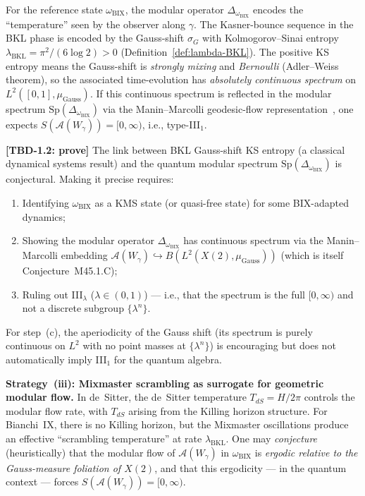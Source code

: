 For the reference state $\omega_{\mathrm{BIX}}$,
the modular operator $\Delta_{\omega_{\mathrm{BIX}}}$ encodes the
``temperature'' seen by the observer along $\gamma$.
The Kasner-bounce sequence in the BKL phase is encoded by the
Gauss-shift $\sigma_G$ with Kolmogorov--Sinai entropy
$\lambda_{\mathrm{BKL}} = \pi^2/(6\log 2) > 0$
(Definition~\ref{def:lambda-BKL}).
The positive KS entropy means the Gauss-shift is
\emph{strongly mixing} and \emph{Bernoulli} (Adler--Weiss theorem),
so the associated time-evolution has \emph{absolutely continuous
spectrum} on $L^2([0,1],\mu_{\mathrm{Gauss}})$.
If this continuous spectrum is reflected in the modular spectrum
$\mathrm{Sp}(\Delta_{\omega_{\mathrm{BIX}}})$
via the Manin--Marcolli geodesic-flow representation~\cite{ManinMarcolli2015},
one expects $S(\mathcal{A}(W_\gamma))=[0,\infty)$, i.e., type-III$_1$.

\noindent\textbf{[TBD-1.2: prove]} The link between BKL Gauss-shift KS entropy
(a classical dynamical systems result) and the quantum modular spectrum
$\mathrm{Sp}(\Delta_{\omega_{\mathrm{BIX}}})$ is conjectural.
Making it precise requires:
\begin{enumerate}
  \item[(a)] Identifying $\omega_{\mathrm{BIX}}$ as a KMS state
     (or quasi-free state) for some BIX-adapted dynamics;
  \item[(b)] Showing the modular operator $\Delta_{\omega_{\mathrm{BIX}}}$
     has continuous spectrum via the Manin--Marcolli embedding
     $\mathcal{A}(W_\gamma)\hookrightarrow
     B(L^2(X(2),\mu_{\mathrm{Gauss}}))$
     (which is itself Conjecture~M45.1.C);
  \item[(c)] Ruling out III$_\lambda$ ($\lambda\in(0,1)$) ---
     i.e., that the spectrum is the full $[0,\infty)$ and not
     a discrete subgroup $\{\lambda^n\}$.
\end{enumerate}
For step~(c), the aperiodicity of the Gauss shift (its spectrum is purely
continuous on $L^2$ with no point masses at $\{\lambda^n\}$) is encouraging
but does not automatically imply III$_1$ for the quantum algebra.

\vspace{4pt}
\noindent\textbf{Strategy~(iii): Mixmaster scrambling as surrogate for geometric modular flow.}
In de~Sitter, the de~Sitter temperature $T_{dS} = H/2\pi$ controls the
modular flow rate, with $T_{dS}$ arising from the Killing horizon structure.
For Bianchi~IX, there is no Killing horizon, but the Mixmaster oscillations
produce an effective ``scrambling temperature'' at rate $\lambda_{\mathrm{BKL}}$.
One may \emph{conjecture} (heuristically) that the modular flow of
$\mathcal{A}(W_\gamma)$ in $\omega_{\mathrm{BIX}}$ is
\emph{ergodic relative to the Gauss-measure foliation of $X(2)$}, and
that this ergodicity --- in the quantum context --- forces
$S(\mathcal{A}(W_\gamma)) = [0,\infty)$.

